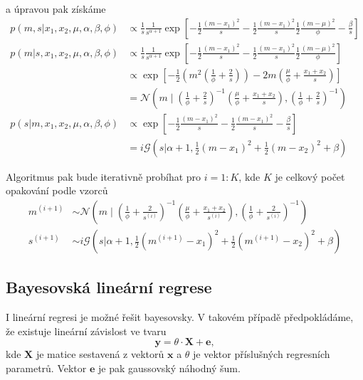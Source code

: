 \documentclass[11pt,oneside,american,czech]{article}
\newcommand{\N}{\mathcal{N}}
\newcommand{\G}{\mathcal{G}}
\newcommand{\half}{\frac{1}{2}}
\begin{document}
a úpravou pak získáme
\begin{align*}
p(m,s|x_1,x_2,\mu, \alpha, \beta, \phi) & \propto \frac{1}{s} \frac{1}{s^{\alpha+1}} \exp \left[ - \frac{1}{2} \frac{(m - x_1)^2}{s} - \frac{1}{2} \frac{(m - x_1)^2}{s} \frac{1}{2} \frac{(m - \mu)^2}{\phi} - \frac{\beta}{s} \right] \\
p(m|s,x_1,x_2,\mu, \alpha, \beta, \phi) & \propto \frac{1}{s} \frac{1}{s^{\alpha+1}} \exp \left[ - \frac{1}{2} \frac{(m - x_1)^2}{s} - \frac{1}{2} \frac{(m - x_1)^2}{s} \frac{1}{2} \frac{(m - \mu)^2}{\phi} \right] \\
& \propto \exp \left[ - \frac{1}{2}\left( m^2 \left( \frac{1}{\phi} + \frac{2}{s} \right) \right) - 2m \left( \frac{\mu}{\phi} + \frac{x_1 + x_2}{s} \right) \right] \\
& = \N \left( m \; \big| \; \left( \frac{1}{\phi} + \frac{2}{s} \right)^{-1} \left( \frac{\mu}{\phi} + \frac{x_1 + x_2}{s} \right),  \left( \frac{1}{\phi} + \frac{2}{s} \right)^{-1} \right) \\
p(s|m,x_1,x_2,\mu, \alpha, \beta, \phi) & \propto  \exp \left[ - \frac{1}{2} \frac{(m - x_1)^2}{s} - \frac{1}{2} \frac{(m - x_1)^2}{s} - \frac{\beta}{s} \right] \\
& = i \G \left( s \big| \alpha + 1, \half(m - x_1)^2 + \half (m - x_2)^2 + \beta \right)
\end{align*}

Algoritmus pak bude iterativně probíhat pro $i = 1:K$, kde $K$ je celkový počet opakování podle vzorců
\begin{align}
	m^{(i+1)} & \sim \N \left( m \; \big| \; \left( \frac{1}{\phi} + \frac{2}{s^{(i)}} \right)^{-1} \left( \frac{\mu}{\phi} + \frac{x_1 + x_2}{s^{(i)}} \right),  \left( \frac{1}{\phi} + \frac{2}{s^{(i)}} \right)^{-1} \right) \label{Eq: Toy Gibbs m}\\
	s^{(i+1)} & \sim i \G \left( s \big| \alpha + 1, \half(m^{(i+1)} - x_1)^2 + \half (m^{(i+1)} - x_2)^2 + \beta \right)	\label{Eq: Toy Gibbs s}
\end{align}

\subsection{Bayesovská lineární regrese}
I lineární regresi je možné řešit bayesovsky. V takovém případě předpokládáme, že existuje lineární závislost ve tvaru
\begin{equation*}
	\boldsymbol{y} = \theta \cdot \boldsymbol{X} + \boldsymbol{e},
\end{equation*}
kde $\boldsymbol{X}$ je matice sestavená z vektorů $\boldsymbol{x}$ a $\theta$ je vektor příslušných regresních parametrů. Vektor $\boldsymbol{e}$ je pak gaussovský náhodný šum.
\end{document}

